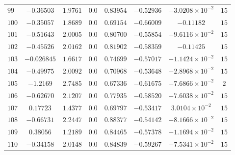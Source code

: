 \begin{landscape}
\begin{center}
\begin{longtable}{lccccccc}
$99$ & $-0.36503$ & $ 1.9761$ & $0.0$ & $ 0.83954$ & $-0.52936$ & $-3.0208\times{}10^{-2}$ & $15$ \\
$100$ & $-0.35057$ & $ 1.8689$ & $0.0$ & $ 0.69154$ & $-0.66009$ & $-0.11182$ & $15$ \\
$101$ & $-0.51643$ & $ 2.0005$ & $0.0$ & $ 0.80700$ & $-0.55854$ & $-9.6116\times{}10^{-2}$ & $15$ \\
$102$ & $-0.45526$ & $ 2.0162$ & $0.0$ & $ 0.81902$ & $-0.58359$ & $-0.11425$ & $15$ \\
$103$ & $-0.026845$ & $ 1.6617$ & $0.0$ & $ 0.74699$ & $-0.57017$ & $-1.1424\times{}10^{-2}$ & $15$ \\
$104$ & $-0.49975$ & $ 2.0092$ & $0.0$ & $ 0.70968$ & $-0.53648$ & $-2.8968\times{}10^{-2}$ & $15$ \\
$105$ & $-1.2169$ & $ 2.7485$ & $0.0$ & $ 0.67336$ & $-0.61675$ & $-7.6866\times{}10^{-2}$ & $2$ \\
$106$ & $-0.62670$ & $ 2.1207$ & $0.0$ & $ 0.77935$ & $-0.58520$ & $-7.6038\times{}10^{-2}$ & $15$ \\
$107$ & $ 0.17723$ & $ 1.4377$ & $0.0$ & $ 0.69797$ & $-0.53417$ & $3.0104\times{}10^{-2}$ & $15$ \\
$108$ & $-0.66731$ & $ 2.2447$ & $0.0$ & $ 0.88377$ & $-0.54142$ & $-8.1666\times{}10^{-2}$ & $15$ \\
$109$ & $ 0.38056$ & $ 1.2189$ & $0.0$ & $ 0.84465$ & $-0.57378$ & $-1.1694\times{}10^{-2}$ & $15$ \\
$110$ & $-0.34158$ & $ 2.0148$ & $0.0$ & $ 0.84839$ & $-0.59267$ & $-7.5341\times{}10^{-2}$ & $15$ \\
  \end{longtable}
\end{center}

\end{landscape}